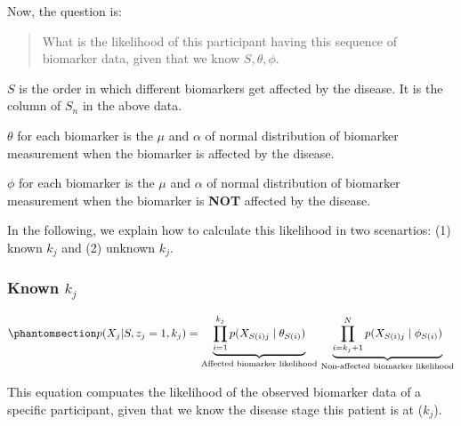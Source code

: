 \documentclass[
  letterpaper,
  DIV=11,
  numbers=noendperiod]{scrreprt}
\begin{document}
Now, the question is:

\begin{quote}
What is the likelihood of this participant having this sequence of
biomarker data, given that we know \(S, \theta, \phi\).
\end{quote}

\(S\) is the order in which different biomarkers get affected by the
disease. It is the column of \(S_n\) in the above data.

\(\theta\) for each biomarker is the \(\mu\) and \(\alpha\) of normal
distribution of biomarker measurement when the biomarker is affected by
the disease.

\(\phi\) for each biomarker is the \(\mu\) and \(\alpha\) of normal
distribution of biomarker measurement when the biomarker is \textbf{NOT}
affected by the disease.

In the following, we explain how to calculate this likelihood in two
scenartios: (1) known \(k_j\) and (2) unknown \(k_j\).

\subsubsection{\texorpdfstring{Known
\(k_j\)}{Known k\_j}}\label{known-k_j}

\begin{equation}\phantomsection\label{eq-known-kj}{
p(X_{j} | S, z_j = 1, k_j) = \underbrace{\prod_{i=1}^{k_j}{p(X_{S(i)j} \mid \theta_{S(i)} )}}_{\text{Affected biomarker likelihood}} \, 
\underbrace{\prod_{i=k_j+1}^N{p(X_{S(i)j} \mid \phi_{S(i)})}}_{\text{Non-affected biomarker likelihood}}
}\end{equation}

This equation compuates the likelihood of the observed biomarker data of
a specific participant, given that we know the disease stage this
patient is at (\(k_j\)).
\end{document}
